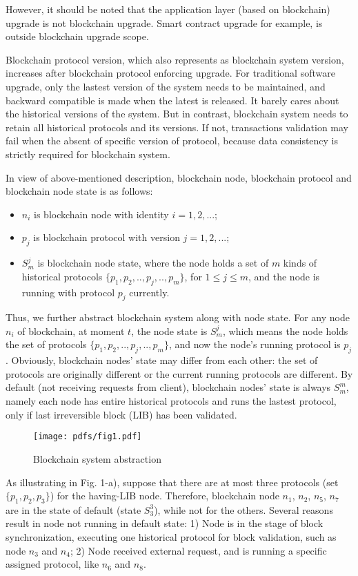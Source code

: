 \documentclass[sigplan,screen]{acmart}
\begin{document}
However, it should be noted that the application layer (based on blockchain)
upgrade is not blockchain upgrade. Smart contract upgrade for
example, is outside blockchain upgrade scope.

Blockchain protocol version, which also represents as blockchain system
version, increases after blockchain protocol enforcing upgrade. For traditional
software upgrade, only the lastest version of the system needs to be
maintained, and backward compatible is made when the latest is
released. It barely cares about the historical versions of the system. But in
contrast, blockchain system needs to retain all historical protocols and its
versions. If not, transactions validation may fail when the absent of specific
version of protocol, because data consistency is strictly required for
blockchain system.

In view of above-mentioned description, blockchain node, blockchain protocol
and blockchain node state is as follows:
\begin{itemize}
  \item $n_i$ is blockchain node with identity $i=1,2,...$;
  \item $p_j$ is blockchain protocol with version $j=1,2,...$;
  \item $S_{m}^{j}$ is blockchain node state, where the node holds a set of $m$
    kinds of historical protocols $\{p_1,p_2,..,p_j,..,p_m\}$, for
    $1{\leq}j{\leq}m$, and the node is running with protocol $p_j$ currently.
\end{itemize}

Thus, we further abstract blockchain system along with node state.
For any node $n_i$ of blockchain, at moment $t$,
the node state is $S_{m}^{j}$, which means the node holds the set of protocols
$\{p_1,p_2,..,p_j,..,p_m\}$, and now the node's running protocol is $p_j$.
Obviously, blockchain nodes' state may differ from each other: the set of
protocols are originally different or the current running protocols are
different. By default (not receiving requests from client),
blockchain nodes' state is always $S_{m}^{m}$, namely each node has entire
historical protocols and runs the lastest protocol, only if last irreversible
block (LIB) has been validated.

\begin{figure}
  \texttt{[image: pdfs/fig1.pdf]}
  \caption{Blockchain system abstraction}
\end{figure}

As illustrating in Fig. 1-a), suppose that there are at most three protocols
(set $\{p_1,p_2,p_3\}$) for the having-LIB node. Therefore,
blockchain node $n_1$, $n_2$, $n_5$, $n_7$ are in the state of default
(state $S_3^3$), while not for the others. Several reasons result in node not
running in default state: 1) Node is in the stage of block synchronization,
executing one historical protocol for block validation, such as node $n_3$ and
$n_4$; 2) Node received external request, and is running a specific assigned
protocol, like $n_6$ and $n_8$.
\end{document}
